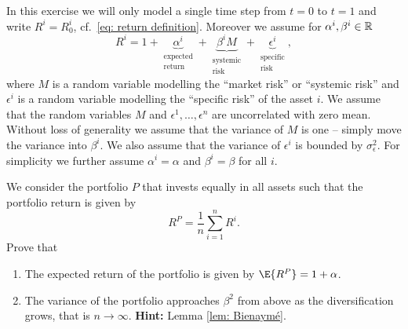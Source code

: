 
\begin{exercise}[subtitle={Diversification and systemic risk \Coffeecup\Coffeecup}]
    In this exercise we will only model a single time step from \(t=0\) to
    \(t=1\) and write \(R^i = R_0^i\), cf.~\eqref{eq: return definition}. Moreover we assume for \(\alpha^i,
    \beta^i \in \mathbb{R}\)
    \[
        R^i = 1
        + \underbrace{\alpha^i}_{\substack{\text{expected}\\ \text{return}}}
        + \underbrace{\beta^i M}_{\substack{\text{systemic}\\\text{risk}}}
        + \underbrace{\epsilon^i}_{\substack{\text{specific}\\\text{risk}}},
    \]
    where \(M\) is a random variable modelling the ``market risk'' or ``systemic
    risk'' and \(\epsilon^i\) is a random variable modelling the ``specific
    risk'' of the asset \(i\). We assume that the random variables \(M\) and
    \(\epsilon^1, \dots, \epsilon^n\) are uncorrelated with zero mean. Without
    loss of generality we assume that the variance of \(M\) is one -- simply move
    the variance into \(\beta^i\). We also assume that the variance of
    \(\epsilon^i\) is bounded by \(\sigma_\epsilon^2\). For simplicity we
    further assume \(\alpha^i = \alpha\) and \(\beta^i = \beta\) for all \(i\).

    We consider the portfolio \(P\) that invests equally in all assets such that
    the portfolio return is given by
    \[
        R^P = \frac1n \sum_{i=1}^n R^i.
    \]
    Prove that
    \begin{enumerate}[label=(\alph*),noitemsep]
        \item\label{it: (diversification) expected return}
        The expected return of the portfolio is given by \(\E{R^P} = 1 + \alpha\).
        
        \item\label{it: (diversification) variance}
        The variance of the portfolio approaches \(\beta^2\) from above as the
        diversification grows, that is \(n\to \infty\). 
        \textbf{Hint:} Lemma \ref{lem: Bienaymé}.
    \end{enumerate}
\end{exercise}

